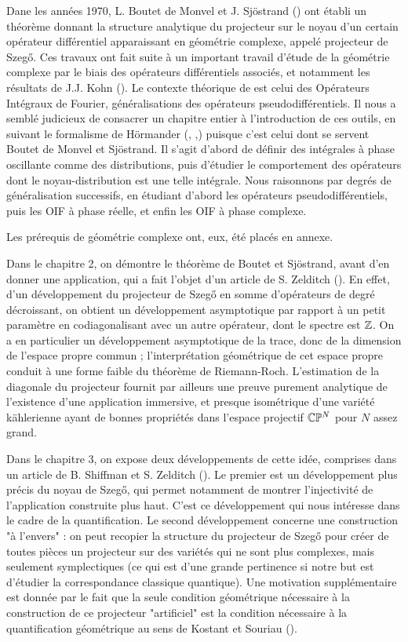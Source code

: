 Dane les années 1970, L. Boutet de Monvel et J. Sj\"ostrand (\cite{BoutetdeMonvel1975}) ont établi un théorème donnant la structure analytique du projecteur sur le noyau d'un certain opérateur différentiel apparaissant en géométrie complexe, appelé projecteur de Szeg\H{o}. Ces travaux ont fait suite à un important travail d'étude de la géométrie complexe par le biais des opérateurs différentiels associés, et notamment les résultats de J.J. Kohn (\cite{kohn1965extension}). Le contexte théorique de \cite{BoutetdeMonvel1975} est celui des Opérateurs Intégraux de Fourier, généralisations des opérateurs pseudodifférentiels. Il nous a semblé judicieux de consacrer un chapitre entier à l'introduction de ces outils, en suivant le formalisme de H\"ormander (\cite{hormander2007}, \cite{hormander1985},\cite{hormander2003analysis}) puisque c'est celui dont se servent Boutet de Monvel et Sj\"ostrand. Il s'agit d'abord de définir des intégrales à phase oscillante comme des distributions, puis d'étudier le comportement des opérateurs dont le noyau-distribution est une telle intégrale. Nous raisonnons par degrés de généralisation successifs, en étudiant d'abord les opérateurs pseudodifférentiels, puis les OIF à phase réelle, et enfin les OIF à phase complexe.

Les prérequis de géométrie complexe ont, eux, été placés en annexe.

Dans le chapitre 2, on démontre le théorème de Boutet et Sj\"ostrand, avant d'en donner une application, qui a fait l'objet d'un article de S. Zelditch (\cite{Zelditch2000}). En effet, d'un développement du projecteur de Szeg\H{o} en somme d'opérateurs de degré décroissant, on obtient un développement asymptotique par rapport à un petit paramètre en codiagonalisant avec un autre opérateur, dont le spectre est $\mathbb{Z}$. On a en particulier un développement asymptotique de la trace, donc de la dimension de l'espace propre commun ; l'interprétation géométrique de cet espace propre conduit à une forme faible du théorème de Riemann-Roch. L'estimation de la diagonale du projecteur fournit par ailleurs une preuve purement analytique de l'existence d'une application immersive, et presque isométrique d'une variété k\"ahlerienne ayant de bonnes propriétés dans l'espace projectif $\mathbb{C}\mathbb{P}^N$ pour $N$ assez grand.

Dans le chapitre 3, on expose deux développements de cette idée, comprises dans un article de B. Shiffman et S. Zelditch (\cite{Shiffman2002}). Le premier est un développement plus précis du noyau de Szeg\H{o}, qui permet notamment de montrer l'injectivité de l'application construite plus haut. C'est ce développement qui nous intéresse dans le cadre de la quantification. Le second développement concerne une construction "à l'envers" : on peut recopier la structure du projecteur de Szeg\H{o} pour créer de toutes pièces un projecteur sur des variétés qui ne sont plus complexes, mais seulement symplectiques (ce qui est d'une grande pertinence si notre but est d'étudier la correspondance classique quantique). Une motivation supplémentaire est donnée par le fait que la seule condition géométrique nécessaire à la construction de ce projecteur "artificiel" est la condition nécessaire à la quantification géométrique au sens de Kostant et Souriau (\cite{Woodhouse1997geometric}).

\chantier
